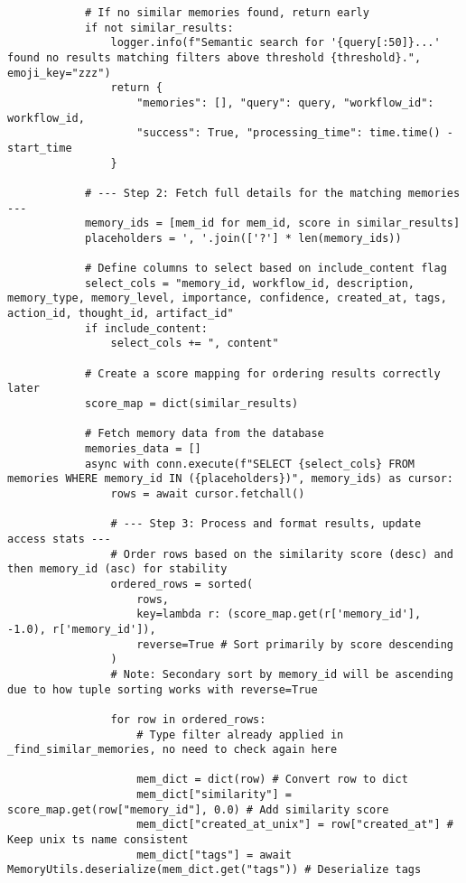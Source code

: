 \documentclass[12pt,a4paper]{article}
\begin{document}
\begin{pageablecode}
\begin{verbatim}
            # If no similar memories found, return early
            if not similar_results:
                logger.info(f"Semantic search for '{query[:50]}...' found no results matching filters above threshold {threshold}.", emoji_key="zzz")
                return {
                    "memories": [], "query": query, "workflow_id": workflow_id,
                    "success": True, "processing_time": time.time() - start_time
                }

            # --- Step 2: Fetch full details for the matching memories ---
            memory_ids = [mem_id for mem_id, score in similar_results]
            placeholders = ', '.join(['?'] * len(memory_ids))

            # Define columns to select based on include_content flag
            select_cols = "memory_id, workflow_id, description, memory_type, memory_level, importance, confidence, created_at, tags, action_id, thought_id, artifact_id"
            if include_content:
                select_cols += ", content"

            # Create a score mapping for ordering results correctly later
            score_map = dict(similar_results)

            # Fetch memory data from the database
            memories_data = []
            async with conn.execute(f"SELECT {select_cols} FROM memories WHERE memory_id IN ({placeholders})", memory_ids) as cursor:
                rows = await cursor.fetchall()

                # --- Step 3: Process and format results, update access stats ---
                # Order rows based on the similarity score (desc) and then memory_id (asc) for stability
                ordered_rows = sorted(
                    rows,
                    key=lambda r: (score_map.get(r['memory_id'], -1.0), r['memory_id']),
                    reverse=True # Sort primarily by score descending
                )
                # Note: Secondary sort by memory_id will be ascending due to how tuple sorting works with reverse=True

                for row in ordered_rows:
                    # Type filter already applied in _find_similar_memories, no need to check again here

                    mem_dict = dict(row) # Convert row to dict
                    mem_dict["similarity"] = score_map.get(row["memory_id"], 0.0) # Add similarity score
                    mem_dict["created_at_unix"] = row["created_at"] # Keep unix ts name consistent
                    mem_dict["tags"] = await MemoryUtils.deserialize(mem_dict.get("tags")) # Deserialize tags


\end{verbatim}
\end{pageablecode}
\end{document}
